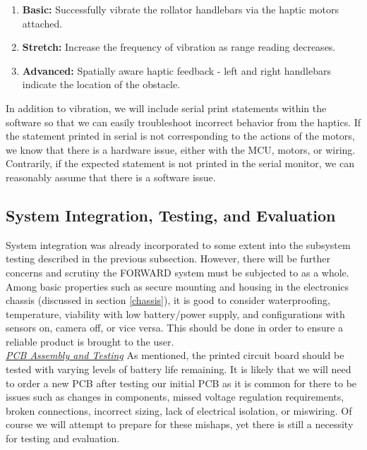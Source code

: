 \begin{enumerate}
	\item \textbf{Basic:} Successfully vibrate the rollator handlebars via the haptic motors attached.
	\item \textbf{Stretch:} Increase the frequency of vibration as range reading decreases.
	\item \textbf{Advanced:} Spatially aware haptic feedback - left and right handlebars indicate the location of the obstacle.
\end{enumerate}

 
 \noindent In addition to vibration, we will include serial print statements within the software so that we can easily troubleshoot incorrect behavior from the haptics. If the statement printed in serial is not corresponding to the actions of the motors, we know that there is a hardware issue, either with the MCU, motors, or wiring. Contrarily, if the expected statement is not printed in the serial monitor, we can reasonably assume that there is a software issue.\\

\subsection{System Integration, Testing, and Evaluation}
\noindent System integration was already incorporated to some extent into the subsystem testing described in the previous subsection. However, there will be further concerns and scrutiny the FORWARD system must be subjected to as a whole. Among basic properties such as secure mounting and housing in the electronics chassis (discussed in section \ref{chassis}), it is good to consider waterproofing, temperature, viability with low battery/power supply, and configurations with sensors on, camera off, or vice versa. This should be done in order to ensure a reliable product is brought to the user.\\

\noindent \underline{\textit{PCB Assembly and Testing}}
\noindent As mentioned, the printed circuit board should be tested with varying levels of battery life remaining. It is likely that we will need to order a new PCB after testing our initial PCB as it is common for there to be issues such as changes in components, missed voltage regulation requirements, broken connections, incorrect sizing, lack of electrical isolation, or miswiring. Of course we will attempt to prepare for these mishaps, yet there is still a necessity  for testing and evaluation.\\

